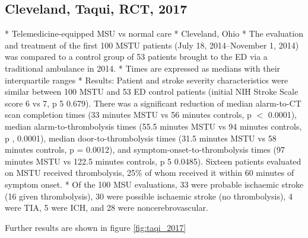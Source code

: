 \subsection{Cleveland, Taqui, RCT, 2017 \cite{taqui_reduction_2017}}

\begin{markdown}
* Telemedicine-equipped MSU vs normal care
* Cleveland, Ohio
* The evaluation and treatment of the first 100 MSTU patients (July 18, 2014–November 1, 2014) was compared to a control group of 53 patients brought to the ED via a traditional ambulance in 2014. 
* Times are expressed as medians with their interquartile ranges
* Results: Patient and stroke severity characteristics were similar between 100 MSTU and 53 ED control patients (initial NIH Stroke Scale score 6 vs 7, p 5 0.679). There was a significant reduction of median alarm-to-CT scan completion times (33 minutes MSTU vs 56 minutes controls, p $<$ 0.0001), median alarm-to-thrombolysis times (55.5 minutes MSTU vs 94 minutes controls, p , 0.0001), median door-to-thrombolysis times (31.5 minutes MSTU vs 58 minutes controls, p = 0.0012), and symptom-onset-to-thrombolysis times (97 minutes MSTU vs 122.5 minutes controls, p 5 0.0485). Sixteen patients evaluated on MSTU received thrombolysis, 25\% of whom received it within 60 minutes of symptom onset.
* Of the 100 MSU evaluations, 33 were probable ischaemic stroke (16 given thrombolysis), 30 were possible ischaemic stroke (no thrombolysis), 4 were TIA, 5 were ICH, and 28 were noncerebrovascular.
   
\end{markdown}

Further results are shown in figure \ref{fig:taqi_2017}

